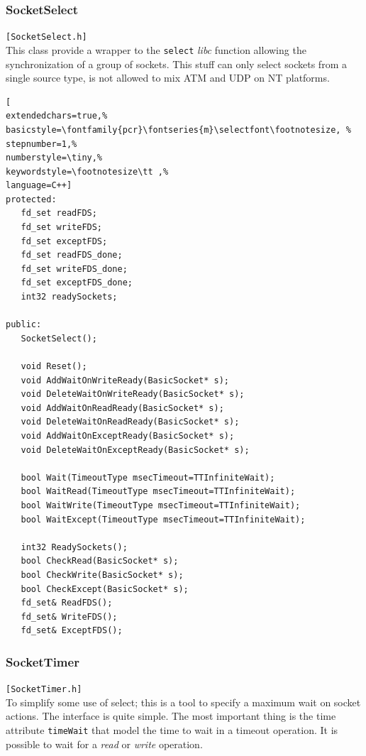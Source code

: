 \subsubsection{SocketSelect}
\texttt{[SocketSelect.h]}\\
This class provide a wrapper to the \texttt{select} \textit{libc} function allowing the synchronization of a group of sockets. This stuff can only select sockets from a single source type, is not allowed to mix ATM and UDP on NT platforms.

\begin{lstlisting}[
extendedchars=true,%
basicstyle=\fontfamily{pcr}\fontseries{m}\selectfont\footnotesize, %
stepnumber=1,%
numberstyle=\tiny,%
keywordstyle=\footnotesize\tt ,%
language=C++]
protected:
   fd_set readFDS;
   fd_set writeFDS;
   fd_set exceptFDS;
   fd_set readFDS_done;
   fd_set writeFDS_done;
   fd_set exceptFDS_done;
   int32 readySockets;

public:
   SocketSelect();

   void Reset();
   void AddWaitOnWriteReady(BasicSocket* s);
   void DeleteWaitOnWriteReady(BasicSocket* s);
   void AddWaitOnReadReady(BasicSocket* s);
   void DeleteWaitOnReadReady(BasicSocket* s);
   void AddWaitOnExceptReady(BasicSocket* s);
   void DeleteWaitOnExceptReady(BasicSocket* s);

   bool Wait(TimeoutType msecTimeout=TTInfiniteWait);
   bool WaitRead(TimeoutType msecTimeout=TTInfiniteWait);
   bool WaitWrite(TimeoutType msecTimeout=TTInfiniteWait);
   bool WaitExcept(TimeoutType msecTimeout=TTInfiniteWait);

   int32 ReadySockets();
   bool CheckRead(BasicSocket* s);
   bool CheckWrite(BasicSocket* s);
   bool CheckExcept(BasicSocket* s);
   fd_set& ReadFDS();
   fd_set& WriteFDS();
   fd_set& ExceptFDS();
\end{lstlisting}



\subsubsection{SocketTimer}
\texttt{[SocketTimer.h]}\\
To simplify some use of select; this is a tool to specify a maximum wait on socket actions. The interface is quite simple. The most important thing is the time attribute \texttt{timeWait} that model the time to wait in a timeout operation.
It is possible to wait for a \textit{read} or \textit{write} operation.


